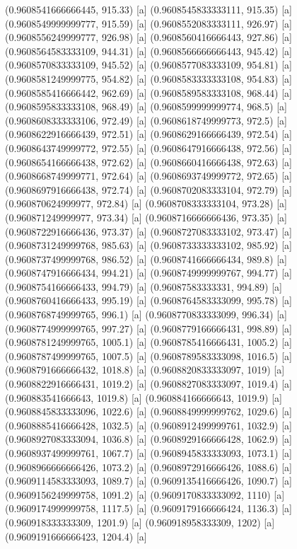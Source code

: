 {{{(0.9608541666666445, 915.33) [a] 
(0.9608545833333111, 915.35) [a] 
(0.9608549999999777, 915.59) [a] 
(0.9608552083333111, 926.97) [a] 
(0.9608556249999777, 926.98) [a] 
(0.9608560416666443, 927.86) [a] 
(0.9608564583333109, 944.31) [a] 
(0.9608566666666443, 945.42) [a] 
(0.9608570833333109, 945.52) [a] 
(0.9608577083333109, 954.81) [a] 
(0.9608581249999775, 954.82) [a] 
(0.9608583333333108, 954.83) [a] 
(0.9608585416666442, 962.69) [a] 
(0.9608589583333108, 968.44) [a] 
(0.9608595833333108, 968.49) [a] 
(0.9608599999999774, 968.5) [a] 
(0.9608608333333106, 972.49) [a] 
(0.9608618749999773, 972.5) [a] 
(0.9608622916666439, 972.51) [a] 
(0.9608629166666439, 972.54) [a] 
(0.9608643749999772, 972.55) [a] 
(0.9608647916666438, 972.56) [a] 
(0.9608654166666438, 972.62) [a] 
(0.9608660416666438, 972.63) [a] 
(0.9608668749999771, 972.64) [a] 
(0.9608693749999772, 972.65) [a] 
(0.9608697916666438, 972.74) [a] 
(0.9608702083333104, 972.79) [a] 
(0.960870624999977, 972.84) [a] 
(0.9608708333333104, 973.28) [a] 
(0.960871249999977, 973.34) [a] 
(0.9608716666666436, 973.35) [a] 
(0.9608722916666436, 973.37) [a] 
(0.9608727083333102, 973.47) [a] 
(0.9608731249999768, 985.63) [a] 
(0.9608733333333102, 985.92) [a] 
(0.9608737499999768, 986.52) [a] 
(0.9608741666666434, 989.8) [a] 
(0.9608747916666434, 994.21) [a] 
(0.9608749999999767, 994.77) [a] 
(0.9608754166666433, 994.79) [a] 
(0.96087583333331, 994.89) [a] 
(0.9608760416666433, 995.19) [a] 
(0.9608764583333099, 995.78) [a] 
(0.9608768749999765, 996.1) [a] 
(0.9608770833333099, 996.34) [a] 
(0.9608774999999765, 997.27) [a] 
(0.9608779166666431, 998.89) [a] 
(0.9608781249999765, 1005.1) [a] 
(0.9608785416666431, 1005.2) [a] 
(0.9608787499999765, 1007.5) [a] 
(0.9608789583333098, 1016.5) [a] 
(0.9608791666666432, 1018.8) [a] 
(0.9608820833333097, 1019) [a] 
(0.9608822916666431, 1019.2) [a] 
(0.9608827083333097, 1019.4) [a] 
(0.960883541666643, 1019.8) [a] 
(0.960884166666643, 1019.9) [a] 
(0.9608845833333096, 1022.6) [a] 
(0.9608849999999762, 1029.6) [a] 
(0.9608885416666428, 1032.5) [a] 
(0.9608912499999761, 1032.9) [a] 
(0.9608927083333094, 1036.8) [a] 
(0.9608929166666428, 1062.9) [a] 
(0.9608937499999761, 1067.7) [a] 
(0.9608945833333093, 1073.1) [a] 
(0.9608966666666426, 1073.2) [a] 
(0.9608972916666426, 1088.6) [a] 
(0.9609114583333093, 1089.7) [a] 
(0.9609135416666426, 1090.7) [a] 
(0.9609156249999758, 1091.2) [a] 
(0.9609170833333092, 1110) [a] 
(0.9609174999999758, 1117.5) [a] 
(0.9609179166666424, 1136.3) [a] 
(0.960918333333309, 1201.9) [a] 
(0.960918958333309, 1202) [a] 
(0.9609191666666423, 1204.4) [a] 
}}}
